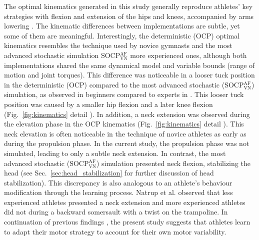 \documentclass[10pt,letterpaper]{article}
\newcommand*\circled[1]{\tikz[baseline=(char.base)]{
            \node[shape=circle,draw,inner sep=2pt] (char) {#1};}}
\begin{document}
The optimal kinematics generated in this study generally reproduce athletes' key strategies with flexion and extension of the hips and knees, accompanied by arms lowering \cite{bradley2020comparison, leboeuf2012optimal}.
The kinematic differences between implementations are subtle, yet some of them are meaningful.
Interestingly, the deterministic (OCP) optimal kinematics resembles the technique used by novice gymnasts and the most advanced stochastic simulation SOCP$_{\text{VN}}^{\text{AF}}$ more experienced ones, although both implementations shared the same dynamical model and variable bounds (range of motion and joint torques).
This difference was noticeable in a looser tuck position in the deterministic (OCP) compared to the most advanced stochastic (SOCP$_{\text{VN}}^{\text{AF}}$) simulation, as observed in beginners compared to experts in \cite{kikuchi2006kinematical}.
This looser tuck position was caused by a smaller hip flexion and a later knee flexion (Fig.~\ref{fig:kinematics} detail \circled{2}). 
In addition, a neck extension was observed during the elevation phase in the OCP kinematics (Fig.~\ref{fig:kinematics} detail \circled{3}). 
This neck elevation is often noticeable in the technique of novice athletes as early as during the propulsion phase.
In the current study, the propulsion phase was not simulated, leading to only a subtle neck extension.
In contrast, the most advanced stochastic (SOCP$_{\text{VN}}^{\text{AF}}$) simulation presented neck flexion, stabilizing the head (see Sec.~\ref{sec:head_stabilization} for further discussion of head stabilization).
This discrepancy is also analogous to an athlete's behaviour modification through the learning process.
Natrup et al. \cite{natrup2021gaze} observed that less experienced athletes presented a neck extension and more experienced athletes did not during a backward somersault with a twist on the trampoline.
In continuation of previous findings \cite{harris1998signal, todorov2002optimal}, the present study suggests that athletes learn to adapt their motor strategy to account for their own motor variability.
\end{document}
